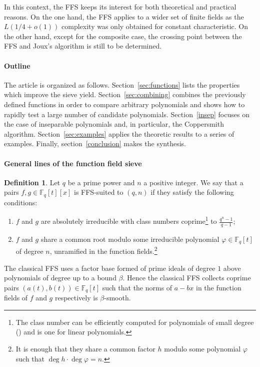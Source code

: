 \documentclass[a4wide]{article}
\newcommand{\F}{{\mathbb F}}
\theoremstyle{plain}
\theoremstyle{definition}
\newtheorem{deff}[theo]{Definition}
\theoremstyle{remark}
\begin{document}
In this context, the FFS keeps its interest for both theoretical and practical
reasons. On the one hand, the FFS applies to a wider set of finite fields
as the $L(1/4+o(1))$ complexity was only obtained for constant
characteristic. On the
other hand, except for the composite case, the crossing point
between the FFS and Joux's algorithm \cite{Jo13} is still to be determined. 



\paragraph{Outline} The article is organized as follows.
Section~\ref{sec:functions}
lists the properties which improve the sieve yield.
Section~\ref{sec:combining} combines the previously defined functions in
order to compare arbitrary polynomials and shows how to rapidly test a large number of candidate polynomials. 
Section~\ref{insep} focuses on the case of inseparable
polynomials and, in particular, the Coppersmith algorithm.
Section~\ref{sec:examples} applies the theoretic results to a series of examples. Finally, section~\ref{conclusion} makes the synthesis.



\iffalse
\paragraph{General lines of the function field
sieve}\label{JouxLercierVariant}
\begin{deff}\label{deff-intro}
	Let $q$ be a prime power and $n$ a positive integer. We say that a pairs $f,g\in\F_q[t][x]$ is FFS-suited to $(q,n)$ if they satisfy the following conditions:
\begin{enumerate}
	\item $f$ and $g$ are absolutely irreducible with class numbers
coprime\footnote{The class number can be efficiently computed for
polynomials of small degree (\cite{MR1484478}) and is one for linear
polynomials.} to $\frac{q^n-1}{q-1}$;
 \item $f$ and $g$ share a common root modulo some irreducible
		polynomial $\varphi\in\F_q[t]$ of degree $n$, unramified in
		the function fields.\footnote{It is
			enough that they share a common factor $h$ modulo some polynomial $\varphi$ such that $\deg h\cdot \deg \varphi=n$.}
\end{enumerate}
\end{deff}

The classical FFS uses a factor base formed of prime ideals of
degree $1$ above polynomials of degree up to a bound $\beta$. Hence the
classical FFS collects coprime pairs $(a(t),b(t))\in \F_q[t]$ such that the
norms of $a-bx$ in the function fields of $f$ and $g$ respectively is
$\beta$-smooth. 
\end{document}
